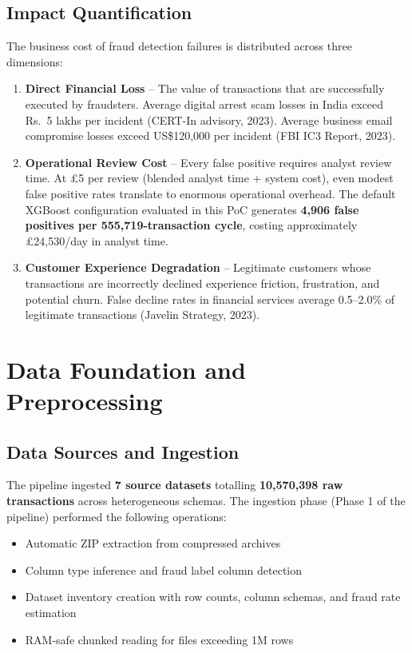 \documentclass[12pt,a4paper,oneside]{book}
\begin{document}
\section{Impact Quantification}

The business cost of fraud detection failures is distributed across three dimensions:

\begin{enumerate}
    \item \textbf{Direct Financial Loss} -- The value of transactions that are successfully executed by fraudsters. Average digital arrest scam losses in India exceed Rs.\ 5 lakhs per incident (CERT-In advisory, 2023). Average business email compromise losses exceed US\$120,000 per incident (FBI IC3 Report, 2023).
    \item \textbf{Operational Review Cost} -- Every false positive requires analyst review time. At \pounds5 per review (blended analyst time + system cost), even modest false positive rates translate to enormous operational overhead. The default XGBoost configuration evaluated in this PoC generates \textbf{4,906 false positives per 555,719-transaction cycle}, costing approximately \pounds24,530/day in analyst time.
    \item \textbf{Customer Experience Degradation} -- Legitimate customers whose transactions are incorrectly declined experience friction, frustration, and potential churn. False decline rates in financial services average 0.5--2.0\% of legitimate transactions (Javelin Strategy, 2023).
\end{enumerate}

\clearpage

\chapter{Data Foundation and Preprocessing}
\label{sec:data_foundation}
\thispagestyle{fancy}

\section{Data Sources and Ingestion}

The pipeline ingested \textbf{7 source datasets} totalling \textbf{10,570,398 raw transactions} across heterogeneous schemas. The ingestion phase (Phase 1 of the pipeline) performed the following operations:

\begin{itemize}
    \item Automatic ZIP extraction from compressed archives
    \item Column type inference and fraud label column detection
    \item Dataset inventory creation with row counts, column schemas, and fraud rate estimation
    \item RAM-safe chunked reading for files exceeding 1M rows
\end{itemize}
\end{document}
